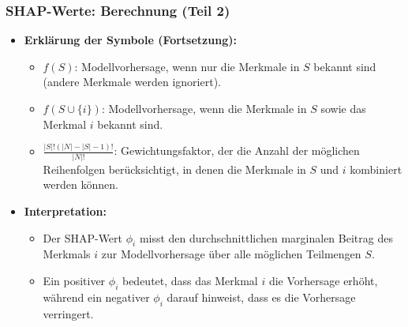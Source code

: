 \documentclass[aspectratio=1610, xcolor=dvipsnames, 9pt]{beamer}
\begin{document}
\begin{frame}
  \frametitle{SHAP-Werte: Berechnung (Teil 2)}
  \begin{itemize}
    \item \textbf{Erklärung der Symbole (Fortsetzung):}
    \begin{itemize}
      \item $f(S)$: Modellvorhersage, wenn nur die Merkmale in $S$ bekannt sind (andere Merkmale werden ignoriert).
      \item $f(S \cup \{i\})$: Modellvorhersage, wenn die Merkmale in $S$ sowie das Merkmal $i$ bekannt sind.
      \item $\frac{|S|! (|N| - |S| - 1)!}{|N|!}$: Gewichtungsfaktor, der die Anzahl der möglichen Reihenfolgen berücksichtigt, in denen die Merkmale in $S$ und $i$ kombiniert werden können.
    \end{itemize}
    \item \textbf{Interpretation:}
    \begin{itemize}
      \item Der SHAP-Wert $\phi_i$ misst den durchschnittlichen marginalen Beitrag des Merkmals $i$ zur Modellvorhersage über alle möglichen Teilmengen $S$.
      \item Ein positiver $\phi_i$ bedeutet, dass das Merkmal $i$ die Vorhersage erhöht, während ein negativer $\phi_i$ darauf hinweist, dass es die Vorhersage verringert.
    \end{itemize}
  \end{itemize}
\end{frame}
\end{document}
